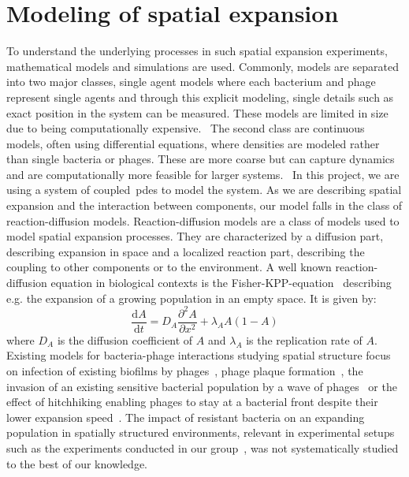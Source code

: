 \section{Modeling of spatial expansion}
To understand the underlying processes in such spatial expansion experiments, mathematical models and simulations are used. Commonly, models are separated into two major classes, single agent models where each bacterium and phage represent single agents and through this explicit modeling, single details such as exact position in the system can be measured. These models are limited in size due to being computationally expensive.~\cite{Nagarajan2022-rv} The second class are continuous models, often using differential equations, where densities are modeled rather than single bacteria or phages. These are more coarse but can capture dynamics and are computationally more feasible for larger systems.~\cite{Succurro2018-if} In this project, we are using a system of coupled~\gls{pde}s to model the system. As we are describing spatial expansion and the interaction between components, our model falls in the class of reaction-diffusion models. 
Reaction-diffusion models are a class of models used to model spatial expansion processes. They are characterized by a diffusion part, describing expansion in space and a localized reaction part, describing the coupling to other components or to the environment. A well known reaction-diffusion equation in biological contexts is the Fisher-KPP-equation~\cite{Fisher1937-rd} describing e.g. the expansion of a growing population in an empty space. It is given by:
\begin{equation}
    \frac{\text{d}A}{\text{d}t} = D_A \frac{\partial^2A}{\partial x^2} + \lambda_A A (1-A)
\end{equation}
where $D_A$ is the diffusion coefficient of $A$ and $\lambda_A$ is the replication rate of $A$.
Existing models for bacteria-phage interactions studying spatial structure focus on infection of existing biofilms by phages~\cite{Simmons2020-cc}, phage plaque formation~\cite{Valdez2025-io}, the invasion of an existing sensitive bacterial population by a wave of phages~\cite{Claydon2021-cu} or the effect of hitchhiking enabling phages to stay at a bacterial front despite their lower expansion speed~\cite{Ping2020-vd}. The impact of resistant bacteria on an expanding population in spatially structured environments, relevant in experimental setups such as the experiments conducted in our group~\cite{Shaer-Tamar2022-cq}, was not systematically studied to the best of our knowledge.